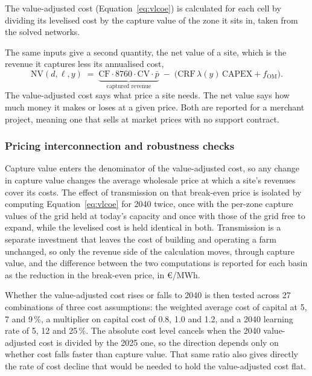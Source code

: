 The value-adjusted cost (Equation~\ref{eq:vlcoe}) is calculated for each cell by
dividing its levelised cost by the capture value of the zone it sits in, taken
from the solved networks.

The same inputs give a second quantity, the net value of a site, which is the
revenue it captures less its annualised cost,
%
\begin{equation}
  \mathrm{NV}(d,\ell,y) \;=\;
  \underbrace{\mathrm{CF}\cdot 8760\cdot \mathrm{CV}\cdot \bar p}_{\text{captured revenue}}
  \;-\; \big(\mathrm{CRF}\,\lambda(y)\,\mathrm{CAPEX} + f_{\mathrm{OM}}\big).
  \label{eq:netvalue}
\end{equation}
%
The value-adjusted cost says what price a site needs. The net value says how
much money it makes or loses at a given price. Both are reported for a merchant
project, meaning one that sells at market prices with no support contract.

\subsubsection{Pricing interconnection and robustness checks}\label{sec:vlcoe_grid_method}

Capture value enters the denominator of the value-adjusted cost, so any change
in capture value changes the average wholesale price at which a site's
revenues cover its costs. The effect of transmission on that break-even price
is isolated by computing Equation~\ref{eq:vlcoe} for 2040 twice, once with the
per-zone capture values of the grid held at today's capacity and once with
those of the grid free to expand, while the levelised cost is held identical
in both. Transmission is a separate investment that leaves the cost of
building and operating a farm unchanged, so only the revenue side of the
calculation moves, through capture value, and the difference between the two
computations is reported for each basin as the reduction in the break-even
price, in \euro/MWh.

Whether the value-adjusted cost rises or falls to 2040 is then tested across 27
combinations of three cost assumptions: the weighted average cost of capital at
5, 7 and 9\,\%, a multiplier on capital cost of 0.8, 1.0 and 1.2, and a 2040
learning rate of 5, 12 and 25\,\%. The absolute cost level cancels when the 2040
value-adjusted cost is divided by the 2025 one, so the direction depends only on
whether cost falls faster than capture value. That same ratio also gives
directly the rate of cost decline that would be needed to hold the
value-adjusted cost flat.

